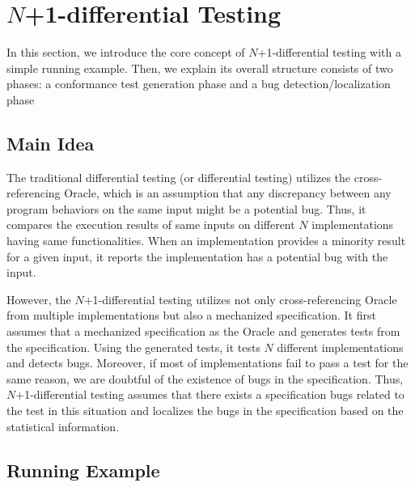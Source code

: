 \section{$N$+1-differential Testing}\label{sec:idea}

In this section, we introduce the core concept of $N$+1-differential testing with a
simple running example.  Then, we explain its overall structure consists of two
phases: a conformance test generation phase and a bug detection/localization
phase

\subsection{Main Idea}

The traditional differential testing (or differential testing) utilizes the
cross-referencing Oracle, which is an assumption that any discrepancy between
any program behaviors on the same input might be a potential bug.  Thus, it
compares the execution results of same inputs on different $N$ implementations
having same functionalities.  When an implementation provides a minority result
for a given input, it reports the implementation has a potential bug with the
input.

However, the $N$+1-differential testing utilizes not only cross-referencing Oracle
from multiple implementations but also a mechanized specification.  It first
assumes that a mechanized specification as the Oracle and generates tests from
the specification.  Using the generated tests, it tests $N$ different
implementations and detects bugs.  Moreover, if most of implementations fail to
pass a test for the same reason, we are doubtful of the existence of bugs in
the specification.  Thus, $N$+1-differential testing assumes that there exists a
specification bugs related to the test in this situation and localizes the bugs
in the specification based on the statistical information.


\subsection{Running Example}

